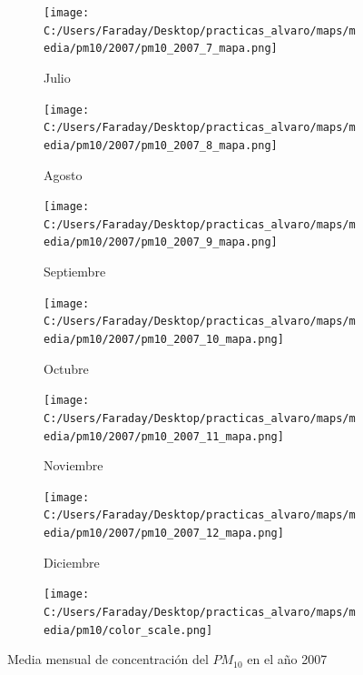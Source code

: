 \documentclass[12pt]{article}
\begin{document}
\begin{figure}[H]
\begin{subfigure}[H]{0.15\textwidth}
\texttt{[image: C:/Users/Faraday/Desktop/practicas\_alvaro/maps/media/pm10/2007/pm10\_2007\_7\_mapa.png]}
\captionsetup{labelformat=empty}
\caption{Julio}
\label{fig:map-pm10-2007-7}
\end{subfigure}
%
\begin{subfigure}[H]{0.15\textwidth}
\texttt{[image: C:/Users/Faraday/Desktop/practicas\_alvaro/maps/media/pm10/2007/pm10\_2007\_8\_mapa.png]}
\captionsetup{labelformat=empty}
\caption{Agosto}
\label{fig:map-pm10-2007-8}
\end{subfigure}
%
\begin{subfigure}[H]{0.15\textwidth}
\texttt{[image: C:/Users/Faraday/Desktop/practicas\_alvaro/maps/media/pm10/2007/pm10\_2007\_9\_mapa.png]}
\captionsetup{labelformat=empty}
\caption{Septiembre}
\label{fig:map-pm10-2007-9}
\end{subfigure}
%
\begin{subfigure}[H]{0.15\textwidth}
\texttt{[image: C:/Users/Faraday/Desktop/practicas\_alvaro/maps/media/pm10/2007/pm10\_2007\_10\_mapa.png]}
\captionsetup{labelformat=empty}
\caption{Octubre}
\label{fig:map-pm10-2007-10}
\end{subfigure}
%
\begin{subfigure}[H]{0.15\textwidth}
\texttt{[image: C:/Users/Faraday/Desktop/practicas\_alvaro/maps/media/pm10/2007/pm10\_2007\_11\_mapa.png]}
\captionsetup{labelformat=empty}
\caption{Noviembre}
\label{fig:map-pm10-2007-11}
\end{subfigure}
%
\begin{subfigure}[H]{0.15\textwidth}
\texttt{[image: C:/Users/Faraday/Desktop/practicas\_alvaro/maps/media/pm10/2007/pm10\_2007\_12\_mapa.png]}
\captionsetup{labelformat=empty}
\caption{Diciembre}
\label{fig:map-pm10-2007-12}
\end{subfigure}

\begin{subfigure}[H]{0.45\textwidth}
\texttt{[image: C:/Users/Faraday/Desktop/practicas\_alvaro/maps/media/pm10/color\_scale.png]}
\captionsetup{labelformat=empty}
\caption{}
\end{subfigure}

\vspace*{-7mm}
\caption{Media mensual de concentración del $PM_{10}$ en el año 2007}
\label{fig:map-pm10-2007}
\end{figure}
\end{document}
